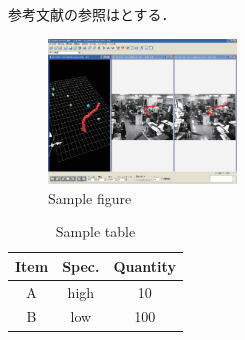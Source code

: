 参考文献の参照は\cite{実用的4足歩行機械}とする．



\begin{figure}[tbp]
  \begin{center}
    \includegraphics[width=50mm, clip]{figure1/sample.eps}
    \caption{Sample figure}
    \label{fig:sample}
  \end{center}
\end{figure}

\begin{table}[tbp]
    \caption{Sample table}
    \label{table:sample}
    \begin{center}
        \begin{tabular} {|c|c|c|}
        \hline
        Item & Spec. & Quantity  \\
        \hline\hline
        A & high & 10 \\
        \hline
        B & low & 100 \\
        \hline
        \end{tabular}
    \end{center}
\end{table}
